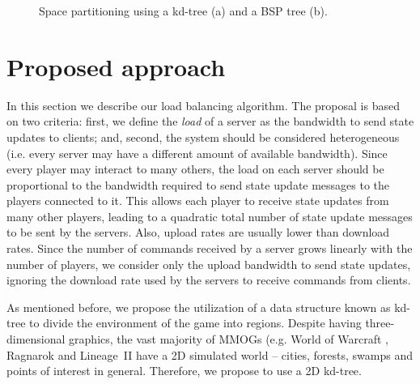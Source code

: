 \documentclass[acmjacm]{acmtrans2m}
\begin{document}
\begin{figure}[!t]
	\centering
	\caption{Space partitioning using a kd-tree (a) and a BSP tree (b).}
	\label{fig:bsp}
\end{figure}

\section{Proposed approach}
\label{sec:proposal}

In this section we describe our load balancing algorithm. The proposal is based on two criteria: first, we define the \textit{load} of a server as the bandwidth to send state updates to clients; and, second, the system should be considered heterogeneous (i.e. every server may have a different amount of available bandwidth). Since every player may interact to many others, the load on each server should be proportional to the bandwidth required to send state update messages to the players connected to it. This allows each player to receive state updates from many other players, leading to a quadratic total number of state update messages to be sent by the servers. Also, upload rates are usually lower than download rates. Since the number of commands received by a server grows linearly with the number of players, we consider only the upload bandwidth to send state updates, ignoring the download rate used by the servers to receive commands from clients.

As mentioned before, we propose the utilization of a data structure known as kd-tree to divide the environment of the game into regions. 
Despite having three-dimensional graphics, the vast majority of MMOGs (e.g. World of Warcraft \cite{worldofwarcraft}, Ragnarok \cite{ragnarok} and \mbox{Lineage II} \cite{lineage2} have a 2D simulated world -- cities, forests, swamps and points of interest in general. Therefore, we propose to use a 2D kd-tree.
\end{document}
